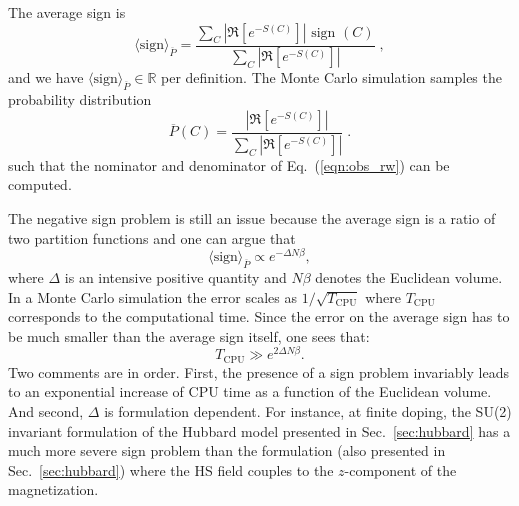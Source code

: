 The average sign is 
\begin{equation}\label{eqn:sign_rw}
	 \langle \text{sign} \rangle_{\overline{P}} =    \frac { \sum_{C}  \left|  \Re \left[ e^{-S(C)} \right]   \right|   \text{ sign }(C) }  {  \sum_{C}   \left| \Re \left[ e^{-S(C)} \right] \right|  } \;,
\end{equation}
and we have  $\langle \text{sign} \rangle_{\overline{P}} \in \mathbb{R}$ per definition.
The Monte Carlo simulation samples the probability distribution 
\begin{equation}  
	 \overline{P}(C) = \frac{ \left|  \Re \left[ e^{-S(C)} \right] \right| }{\sum_C \left|  \Re \left[ e^{-S(C)} \right]  \right| }\;.
\end{equation}
such that the nominator and denominator of  Eq.~(\ref{eqn:obs_rw})  can be computed.   

The negative sign problem is still an issue because the average sign is a ratio of two partition functions and one can argue that 
\begin{equation}
 \langle \text{sign} \rangle_{\overline{P}}   \propto e^{-  \Delta N \beta},
\end{equation}
where $\Delta $ is an intensive positive quantity and $N \beta$ denotes the  Euclidean volume.    In a Monte Carlo simulation the  error scales as $ 1/\sqrt{T_\text{CPU}} $   where $T_\text{CPU}$ corresponds to the computational  time.  Since the error on the  average sign has to be much smaller than the average sign itself,   one sees that:
\begin{equation}
	T_\text{CPU}  \gg e^{2 \Delta N \beta}.
\end{equation}   
Two comments are in order. First, the presence of a sign problem invariably leads to an exponential increase of CPU time as a function of the Euclidean volume. And second,  $\Delta$ is formulation dependent.  
For instance, at finite doping, the SU(2) invariant formulation of the Hubbard model presented in Sec.~\ref{sec:hubbard} has a much more severe sign problem than the formulation (also presented in Sec.~\ref{sec:hubbard}) where the HS field couples to the $z$-component of the magnetization. 




 
